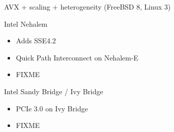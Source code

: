 \documentclass[xcolor={dvipsnames,table}]{beamer}
\begin{document}
\begin{frame}[t]{AVX + scaling + heterogeneity (FreeBSD 8, Linux 3)}
\begin{block}{Intel Nehalem}
\begin{itemize}
\item Adds SSE4.2
\item Quick Path Interconnect on Nehalem-E
\item FIXME
\end{itemize}
\end{block}
\begin{block}{Intel Sandy Bridge / Ivy Bridge}
\begin{itemize}
\item PCIe 3.0 on Ivy Bridge
\item FIXME
\end{itemize}
\end{block}
\vfill
\begin{center}
\end{center}
\end{frame}
\end{document}
